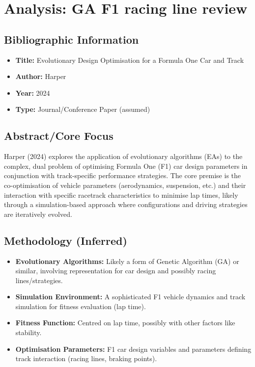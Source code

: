 \section{Analysis: GA F1 racing line review}\label{sec:harper-2024-evolutionary}

\subsection{Bibliographic Information}\label{subsec:bibliographic-information}
\begin{itemize}
    \item \textbf{Title:} Evolutionary Design Optimisation for a Formula One Car and Track
    \item \textbf{Author:} Harper
    \item \textbf{Year:} 2024
    \item \textbf{Type:} Journal/Conference Paper (assumed)
\end{itemize}

\subsection{Abstract/Core Focus}\label{subsec:abstract/core-focus}
Harper (2024) explores the application of evolutionary algorithms (EAs) to the complex, dual problem of optimising Formula One (F1) car design parameters in conjunction with track-specific performance strategies.
The core premise is the co-optimisation of vehicle parameters (aerodynamics, suspension, etc.) and their interaction with specific racetrack characteristics to minimise lap times, likely through a simulation-based approach where configurations and driving strategies are iteratively evolved.

\subsection{Methodology (Inferred)}\label{subsec:methodology-(inferred)}
\begin{itemize}
    \item \textbf{Evolutionary Algorithms:} Likely a form of Genetic Algorithm (GA) or similar, involving representation for car design and possibly racing lines/strategies.
    \item \textbf{Simulation Environment:} A sophisticated F1 vehicle dynamics and track simulation for fitness evaluation (lap time).
    \item \textbf{Fitness Function:} Centred on lap time, possibly with other factors like stability.
    \item \textbf{Optimisation Parameters:} F1 car design variables and parameters defining track interaction (racing lines, braking points).
\end{itemize}

